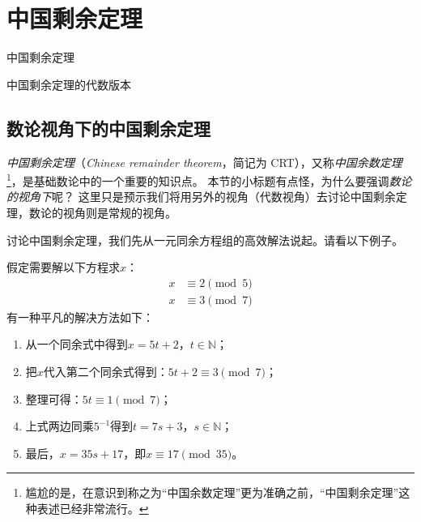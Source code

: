 \chapter{中国剩余定理}
\label{chap:crt} 
\begin{introduction}
  \item 中国剩余定理
  \item  中国剩余定理的代数版本
\end{introduction}

\section{数论视角下的中国剩余定理}
\label{sec:NT_crt}
\emph{中国剩余定理}（\emph{Chinese remainder theorem}，简记为 CRT），又称\emph{中国余数定理}
 
\footnote{尴尬的是，在意识到称之为“中国余数定理”更为准确之前，“中国剩余定理”这种表述已经非常流行。}，是基础数论中的一个重要的知识点。
本节的小标题有点怪，为什么要强调\emph{数论的视角下}呢？
这里只是预示我们将用另外的视角（代数视角）去讨论中国剩余定理，数论的视角则是常规的视角。

讨论中国剩余定理，我们先从一元同余方程组的高效解法说起。请看以下例子。
\begin{example}
\label{exm:crt_moti}
	假定需要解以下方程求$x$：
	\begin{align*}
	x &\equiv 2  \pmod{5} \\
	x &\equiv 3  \pmod{7}
    \end{align*}
有一种平凡的解决方法如下：
   \begin{enumerate}
	\item 从一个同余式中得到$x = 5t + 2$，$t \in \mathbb{N}$；
	
	\item 把$x$代入第二个同余式得到：$ 5t + 2 \equiv 3  \pmod{7}$；
	
	\item 整理可得：$5t \equiv 1 \pmod{7}$；
	
	\item 上式两边同乘$5^{-1}$得到$t = 7s + 3$，$s \in \mathbb{N}$；
	
	\item 最后，$x = 35s + 17$，即$x \equiv 17  \pmod{35}$。
	\end{enumerate} 
\end{example} 

